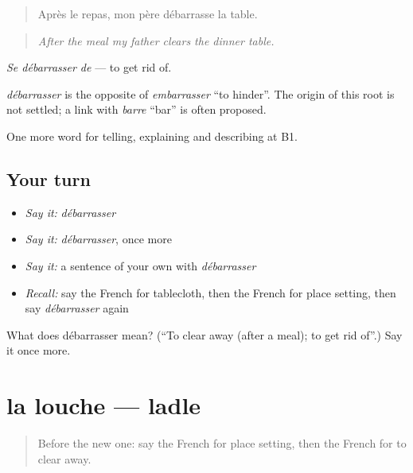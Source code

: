 \begin{quote}
Après le repas, mon père débarrasse la table.
\end{quote}

\begin{quote}
\emph{After the meal my father clears the dinner table.}
\end{quote}

\emph{Se débarrasser de} — to get rid of.

\begin{cousinweb}
\emph{débarrasser} is the opposite of \emph{embarrasser} \textquotedblleft{}to hinder\textquotedblright{}. The origin of this root is not settled; a link with \emph{barre} \textquotedblleft{}bar\textquotedblright{} is often proposed.
\end{cousinweb}

\begin{grammarlens}[title={What you've built}]
One more word for telling, explaining and describing at B1.
\end{grammarlens}

\subsection*{Your turn}
\begin{itemize}
\raggedright
  \item \emph{Say it:} \emph{débarrasser}
  \item \emph{Say it:} \emph{débarrasser}, once more
  \item \emph{Say it:} a sentence of your own with \emph{débarrasser}
  \item \emph{Recall:} say the French for tablecloth, then the French for place setting, then say \emph{débarrasser} again
\end{itemize}

\begin{tcolorbox}[breakable,colback=teal!4,colframe=teal!35!black,title={Before you move on}]
What does débarrasser mean? (\textquotedblleft{}To clear away (after a meal); to get rid of\textquotedblright{}.) Say it once more.
\end{tcolorbox}
\section[la louche]{la louche — ladle}

\label{lesson:FR-C529-louche}



\begin{quote}
Before the new one: say the French for place setting, then the French for to clear away.
\end{quote}

